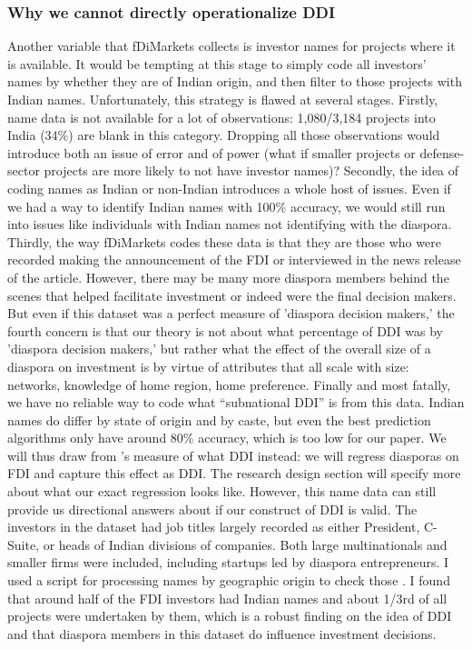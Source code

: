 \documentclass[12pt]{article}
\begin{document}
    \subsubsection{Why we cannot directly operationalize DDI} \label{subsection:no operationalizing DDI}
    Another variable that fDiMarkets collects is investor names for projects where it is available. It would be tempting at this stage to simply code all investors' names by whether they are of Indian origin, and then filter to those projects with Indian names. Unfortunately, this strategy is flawed at several stages.
    Firstly, name data is not available for a lot of observations: 1,080/3,184 projects into India (34\%) are blank in this category. Dropping all those observations would introduce both an issue of error and of power (what if smaller projects or defense-sector projects are more likely to not have investor names)? Secondly, the idea of coding names as Indian or non-Indian introduces a whole host of issues. Even if we had a way to identify Indian names with 100\% accuracy, we would still run into issues like individuals with Indian names not identifying with the diaspora.
    Thirdly, the way fDiMarkets codes these data is that they are those who were recorded making the announcement of the FDI or interviewed in the news release of the article. However, there may be many more diaspora members behind the scenes that helped facilitate investment or indeed were the final decision makers. But even if this dataset was a perfect measure of 'diaspora decision makers,' the fourth concern is that our theory is not about what percentage of DDI was by 'diaspora decision makers,' but rather what the effect of the overall size of a diaspora on investment is by virtue of attributes that all scale with size: networks, knowledge of home region, home preference. Finally and most fatally, we have no reliable way to code what ``subnational DDI'' is from this data. Indian names do differ by state of origin and by caste, but even the best prediction algorithms only have around 80\% accuracy, which is too low for our paper. \citep{dhingra_instate_2023}
    We will thus draw from \citet{leblang_familiarity_2010}'s measure of what DDI instead: we will regress diasporas on FDI and capture this effect as DDI. The research design section will specify more about what our exact regression looks like.
   However, this name data can still provide us directional answers about if our construct of DDI is valid. The investors in the dataset had job titles largely recorded as either President, C-Suite, or heads of Indian divisions of companies. Both large multinationals and smaller firms were included, including startups led by diaspora entrepreneurs. I used a script for processing names by geographic origin to check those  \citep{dhingra_instate_2023}. I found that around half of the FDI investors had Indian names and about 1/3rd of all projects were undertaken by them, which is a robust finding on the idea of DDI and that diaspora members in this dataset do influence investment decisions.
\end{document}
